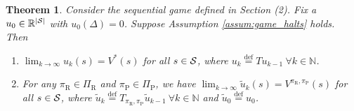 \documentclass[aoas]{imsart}
\theoremstyle{plain}
\newtheorem{theorem}{Theorem}
\theoremstyle{definition}
\newcommand{\defeq}{\stackrel{\text{def}}{=}}
\newcommand{\abs}[1]{\left\lvert#1\right\rvert}
\begin{document}
       
          \begin{theorem}
           \label{lem:vi_convergence}
           Consider the sequential game defined in Section (2). Fix a $u_0 \in \mathbb{R}^{\abs{\cal S}}$ with $u_0(\Delta) = 0$. Suppose Assumption \ref{assum:game_halts} holds. Then
           \begin{enumerate}%
               \item $\lim_{k \to \infty}u_k(s) = V^*(s)$ for all $s \in {\cal S}$, where $u_{k} \defeq Tu_{k-1} \ \forall k \in \mathbb{N}$.
               \item For any $\pi_\text{R} \in \Pi_\text{R}$ and $\pi_\text{P} \in \Pi_\text{P}$, we have $\lim_{k \to \infty}\tilde u_k(s) = V^{\pi_\text{R},\pi_\text{P}}(s)$ for all $s \in {\cal S}$, where $\tilde u_k \defeq T_{\pi_\text{R},\pi_\text{P}}\tilde u_{k-1} \ \forall k \in \mathbb{N}$ and $\tilde u_0 \defeq u_0$.
           \end{enumerate}
       \end{theorem}
\end{document}
